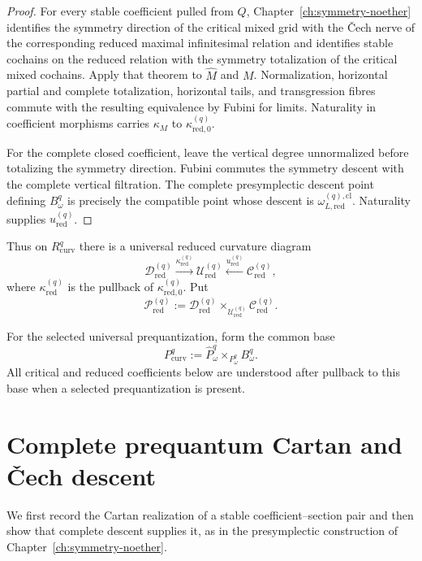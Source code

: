 \begin{proof}
For every stable coefficient pulled from $Q$, Chapter~\ref{ch:symmetry-noether}
identifies the symmetry direction of the critical mixed grid with the \v{C}ech
nerve of the corresponding reduced maximal infinitesimal relation and identifies
stable cochains on the reduced relation with the symmetry totalization of the
critical mixed cochains.  Apply that theorem to $\widehat M$ and $M$.
Normalization, horizontal partial and complete totalization, horizontal tails,
and transgression fibres commute with the resulting equivalence by Fubini for
limits.  Naturality in coefficient morphisms carries $\kappa_M$ to
$\kappa_{\mathrm{red},0}^{(q)}$.

For the complete closed coefficient, leave the vertical degree unnormalized before
totalizing the symmetry direction.  Fubini commutes the symmetry descent with the
complete vertical filtration.  The complete presymplectic descent point defining
$B_\omega^q$ is precisely the compatible point whose descent is
$\omega_{L,\mathrm{red}}^{(q),\mathrm{cl}}$.  Naturality supplies
$u_{\mathrm{red}}^{(q)}$.
\end{proof}

Thus on $R_{\mathrm{curv}}^q$ there is a universal reduced curvature diagram
\[
\boxed{
\mathscr D_{\mathrm{red}}^{(q)}
\xrightarrow{\kappa_{\mathrm{red}}^{(q)}}
\mathscr U_{\mathrm{red}}^{(q)}
\xleftarrow{u_{\mathrm{red}}^{(q)}}
\mathscr C_{\mathrm{red}}^{(q)},
}
\]
where $\kappa_{\mathrm{red}}^{(q)}$ is the pullback of
$\kappa_{\mathrm{red},0}^{(q)}$.  Put
\[
\mathscr P_{\mathrm{red}}^{(q)}
:=
\mathscr D_{\mathrm{red}}^{(q)}
\times_{\mathscr U_{\mathrm{red}}^{(q)}}
\mathscr C_{\mathrm{red}}^{(q)}.
\]

For the selected universal prequantization, form the common base
\[
P_{\mathrm{curv}}^q
:=
\widehat P_\omega^q
\times_{P_\omega^q}
B_\omega^q.
\]
All critical and reduced coefficients below are understood after pullback to this
base when a selected prequantization is present.

\section{Complete prequantum Cartan and \v{C}ech descent}
\label{sec:prequantum-complete-cech-descent}

We first record the Cartan realization of a stable coefficient--section pair and
then show that complete descent supplies it, as in the presymplectic construction
of Chapter~\ref{ch:symmetry-noether}.

